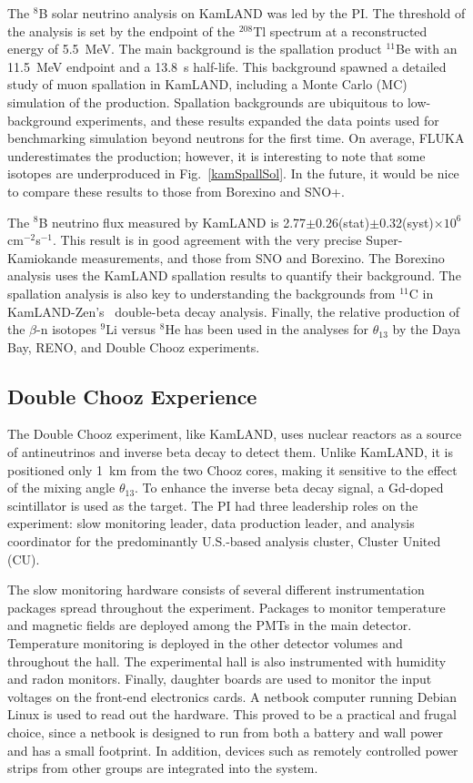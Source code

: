 The $^{8}$B solar neutrino analysis on KamLAND was led by the PI. The threshold of the analysis is set by the endpoint of the $^{208}$Tl spectrum at a reconstructed energy of 5.5~MeV. The main background is the spallation product $^{11}$Be with an 11.5~MeV endpoint and a 13.8~s half-life. This background spawned a detailed study of muon spallation in KamLAND, including a Monte Carlo (MC) simulation of the production\cite{kamspall}. Spallation backgrounds are ubiquitous to low-background experiments, and these results expanded the data points used for benchmarking simulation beyond neutrons for the first time. On average, FLUKA underestimates the production; however, it is interesting to note that some isotopes are underproduced in Fig.~\ref{kamSpallSol}. In the future, it would be nice to compare these results to those from Borexino and SNO+.

The $^{8}$B neutrino flux measured by KamLAND is 2.77$\pm$0.26(stat)$\pm$0.32(syst)$\times10^{6}$cm$^{-2}$s$^{-1}$\cite{kamboron}. This result is in good agreement with the very precise Super-Kamiokande measurements\cite{skboron}, and those from SNO\cite{snoboron} and Borexino\cite{borexinoboron}. The Borexino analysis uses the KamLAND spallation results to quantify their background.  The spallation analysis is also key to understanding the backgrounds from $^{11}$C in KamLAND-Zen's \isoxe~double-beta decay analysis\cite{KZ2nu}. Finally, the relative production of the $\beta$-n isotopes $^{9}$Li versus $^{8}$He has been used in the analyses for $\theta_{13}$ by the Daya Bay\cite{dayabay}, RENO\cite{reno}, and Double Chooz\cite{dcone, dctwo} experiments.

\subsection{Double Chooz Experience} 
The Double Chooz experiment, like KamLAND, uses nuclear reactors as a source of antineutrinos and inverse beta decay to detect them. Unlike KamLAND, it is positioned only 1~km  from the two Chooz cores, making it sensitive to the effect of the mixing angle $\theta_{13}$. To enhance the inverse beta decay signal, a Gd-doped scintillator is used as the target. The PI had three leadership roles on the experiment: slow monitoring leader, data production leader, and analysis coordinator for the predominantly U.S.-based analysis cluster, Cluster United (CU). 

The slow monitoring hardware consists of several different instrumentation packages spread throughout the experiment.  Packages to monitor temperature and magnetic fields are deployed among the PMTs in the main detector. Temperature monitoring is deployed in the other detector volumes and throughout the hall. The experimental hall is also instrumented with humidity and radon monitors. Finally, daughter boards are used to monitor the input voltages on the front-end electronics cards. A netbook computer running Debian Linux is used to read out the hardware. This proved to be a practical and frugal choice, since a netbook is designed to run from both a battery and wall power and has a small footprint. In addition, devices such as remotely controlled power strips from other groups are integrated into the system. 

